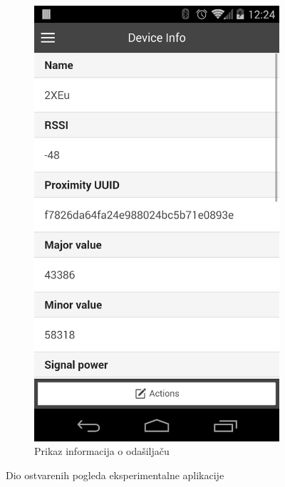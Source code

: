 \begin{figure}[H]
\begin{subfigure}[b]{0.45\textwidth}
        \includegraphics[scale=0.15]{pictures/experimental2}
        \caption{Prikaz informacija o odašiljaču}
        \label{fig:exp2}
    \end{subfigure}
    
    \caption{Dio ostvarenih pogleda eksperimentalne aplikacije}
\end{figure}

